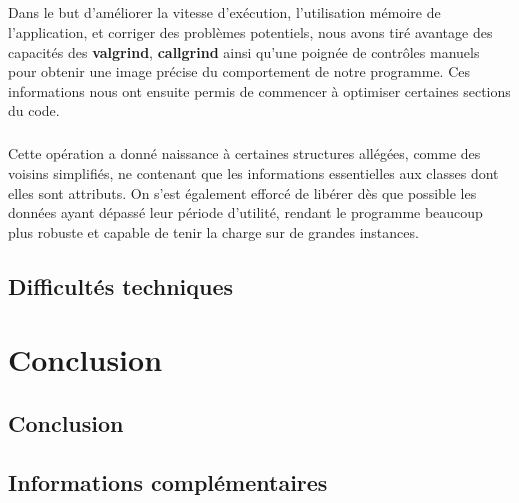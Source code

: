 \documentclass[a4paper,10pt]{report}
\begin{document}
\paragraph{}
  Dans le but d'améliorer la vitesse d'exécution, l'utilisation mémoire de
l'application, et corriger des problèmes potentiels, nous avons tiré avantage
des capacités des \textbf{valgrind}, \textbf{callgrind} ainsi qu'une poignée de
contrôles manuels pour obtenir une image précise du comportement de notre
programme. Ces informations nous ont ensuite permis de commencer à optimiser
certaines sections du code.

\paragraph{}
  Cette opération a donné naissance à certaines structures allégées, comme des
voisins simplifiés, ne contenant que les informations essentielles aux classes
dont elles sont attributs. On s'est également efforcé de libérer dès que
possible les données ayant dépassé leur période d'utilité, rendant le programme
beaucoup plus robuste et capable de tenir la charge sur de grandes instances.


\section{Difficultés techniques}

\chapter{Conclusion}
\section{Conclusion}


\section{Informations complémentaires}
\end{document}
